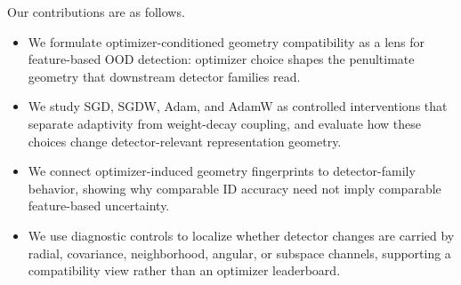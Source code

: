 Our contributions are as follows.
\begin{itemize}
    \item We formulate optimizer-conditioned geometry compatibility as a lens for
    feature-based OOD detection: optimizer choice shapes the penultimate geometry
    that downstream detector families read.

    \item We study SGD, SGDW, Adam, and AdamW as controlled interventions that
    separate adaptivity from weight-decay coupling, and evaluate how these choices
    change detector-relevant representation geometry.

    \item We connect optimizer-induced geometry fingerprints to detector-family
    behavior, showing why comparable ID accuracy need not imply comparable
    feature-based uncertainty.

    \item We use diagnostic controls to localize whether detector changes are
    carried by radial, covariance, neighborhood, angular, or subspace channels,
    supporting a compatibility view rather than an optimizer leaderboard.
\end{itemize}
